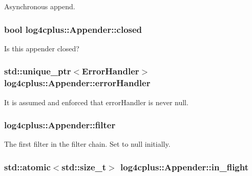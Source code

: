 Asynchronous append. 

\hypertarget{classlog4cplus_1_1Appender_a73bd088d54955fd0153c74644e2b944c}{
\subsubsection[{closed}]{\setlength{\rightskip}{0pt plus 5cm}bool log4cplus\-::\-Appender\-::closed\hspace{0.3cm}{\ttfamily [protected]}}}\label{classlog4cplus_1_1Appender_a73bd088d54955fd0153c74644e2b944c}
Is this appender closed? \hypertarget{classlog4cplus_1_1Appender_a4a177c2a1ad2aa5945aeac1bd83cfc84}{
\subsubsection[{error\-Handler}]{\setlength{\rightskip}{0pt plus 5cm}std\-::unique\-\_\-ptr$<${\bf Error\-Handler}$>$ log4cplus\-::\-Appender\-::error\-Handler\hspace{0.3cm}{\ttfamily [protected]}}}\label{classlog4cplus_1_1Appender_a4a177c2a1ad2aa5945aeac1bd83cfc84}
It is assumed and enforced that error\-Handler is never null. \hypertarget{classlog4cplus_1_1Appender_a1eb5991691361dac62811a506b158bb7}{
\subsubsection[{filter}]{ log4cplus\-::\-Appender\-::filter\hspace{0.3cm}{\ttfamily [protected]}}}\label{classlog4cplus_1_1Appender_a1eb5991691361dac62811a506b158bb7}
The first filter in the filter chain. Set to {\ttfamily null} initially. \hypertarget{classlog4cplus_1_1Appender_a0fa717108bb6f918c5671ec697e71bb8}{
\subsubsection[{in\-\_\-flight}]{\setlength{\rightskip}{0pt plus 5cm}std\-::atomic$<$std\-::size\-\_\-t$>$ log4cplus\-::\-Appender\-::in\-\_\-flight\hspace{0.3cm}{\ttfamily [protected]}}}\label{classlog4cplus_1_1Appender_a0fa717108bb6f918c5671ec697e71bb8}
